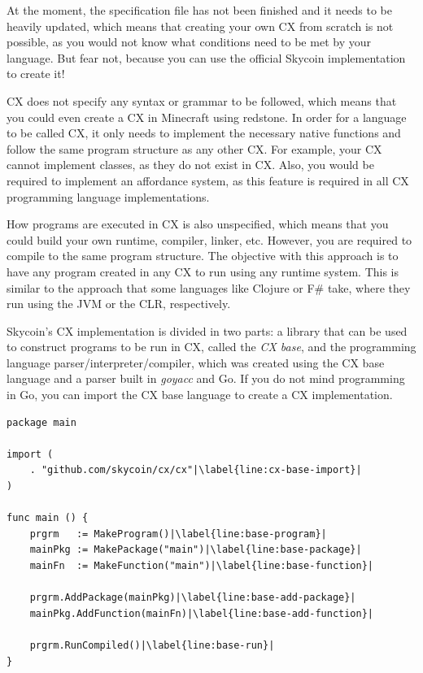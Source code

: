 \documentclass[11pt,fleqn,openany]{book} %
\begin{document}
At the moment, the specification file has not been finished and it needs to be heavily updated, which means that creating your own CX from scratch is not possible, as you would not know what conditions need to be met by your language. But fear not, because you can use the official Skycoin implementation to create it!

CX does not specify any syntax or grammar to be followed, which means that you could even create a CX in Minecraft using redstone. In order for a language to be called CX, it only needs to implement the necessary native functions and follow the same program structure as any other CX. For example, your CX cannot implement classes, as they do not exist in CX. Also, you would be required to implement an affordance system, as this feature is required in all CX programming language implementations.

How programs are executed in CX is also unspecified, which means that you could build your own runtime, compiler, linker, etc. However, you are required to compile to the same program structure. The objective with this approach is to have any program created in any CX to run using any runtime system. This is similar to the approach that some languages like Clojure or F\# take, where they run using the JVM or the CLR, respectively.

Skycoin's CX implementation is divided in two parts: a library that can be used to construct programs to be run in CX, called the \emph{CX base}, and the programming language parser/interpreter/compiler, which was created using the CX base language and a parser built in \emph{goyacc} and Go. If you do not mind programming in Go, you can import the CX base language to create a CX implementation.

\begin{lstlisting}[caption={Writing a program using CX base language},captionpos=b,label={listing:cx-base-program}]
package main

import (
	. "github.com/skycoin/cx/cx"|\label{line:cx-base-import}|
)

func main () {
	prgrm   := MakeProgram()|\label{line:base-program}|
	mainPkg := MakePackage("main")|\label{line:base-package}|
	mainFn  := MakeFunction("main")|\label{line:base-function}|

	prgrm.AddPackage(mainPkg)|\label{line:base-add-package}|
	mainPkg.AddFunction(mainFn)|\label{line:base-add-function}|

	prgrm.RunCompiled()|\label{line:base-run}|
}
\end{lstlisting}
\end{document}
